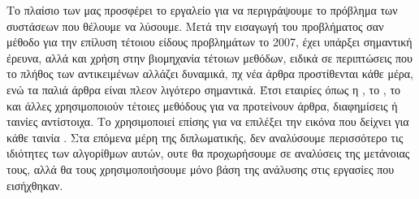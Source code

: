 Το πλαίσιο των  μας προσφέρει το εργαλείο για να περιγράψουμε το πρόβλημα των συστάσεων που θέλουμε να λύσουμε. Μετά την εισαγωγή του προβλήματος σαν μέθοδο για την επίλυση τέτοιου είδους προβλημάτων το 2007, έχει υπάρξει σημαντική έρευνα, αλλά και χρήση στην βιομηχανία τέτοιων μεθόδων, ειδικά σε περιπτώσεις που το πλήθος των αντικειμένων αλλάζει δυναμικά, πχ νέα άρθρα προστίθενται κάθε μέρα, ενώ τα παλιά άρθρα είναι πλεον λιγότερο σημαντικά. Έτσι εταιρίες όπως η , το , το  και άλλες χρησιμοποιούν τέτοιες μεθόδους για να προτείνουν άρθρα, διαφημίσεις ή ταινίες αντίστοιχα. Το  χρησιμοποιεί επίσης  για να επιλέξει την εικόνα που δείχνει για κάθε ταινία \cite{blog_artwork_2017}.  Στα επόμενα μέρη της διπλωματικής, δεν αναλύσουμε περισσότερο τις ιδιότητες των αλγορίθμων αυτών, ουτε θα προχωρήσουμε σε αναλύσεις της μετάνοιας τους, αλλά θα τους χρησιμοποιήσουμε μόνο βάση της ανάλυσης στις εργασίες που εισήχθηκαν.

